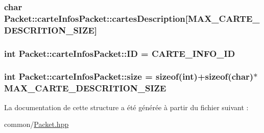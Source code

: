 \subsubsection[{cartes\+Description}]{\setlength{\rightskip}{0pt plus 5cm}char Packet\+::carte\+Infos\+Packet\+::cartes\+Description\mbox{[}{\bf M\+A\+X\+\_\+\+C\+A\+R\+T\+E\+\_\+\+D\+E\+S\+C\+R\+I\+T\+I\+O\+N\+\_\+\+S\+I\+Z\+E}\mbox{]}}\label{structPacket_1_1carteInfosPacket_a3b02e4ea49980ee77d5882fcf5f258ba}
\hypertarget{structPacket_1_1carteInfosPacket_aa385cf584f070650fa90455a9e4d9f90}{}
\subsubsection[{I\+D}]{\setlength{\rightskip}{0pt plus 5cm}int Packet\+::carte\+Infos\+Packet\+::\+I\+D = {\bf C\+A\+R\+T\+E\+\_\+\+I\+N\+F\+O\+\_\+\+I\+D}}\label{structPacket_1_1carteInfosPacket_aa385cf584f070650fa90455a9e4d9f90}
\hypertarget{structPacket_1_1carteInfosPacket_a5b1c8a614c8dcfa1d01d59210bab4d85}{}
\subsubsection[{size}]{\setlength{\rightskip}{0pt plus 5cm}int Packet\+::carte\+Infos\+Packet\+::size = sizeof(int)+sizeof(char)$\ast${\bf M\+A\+X\+\_\+\+C\+A\+R\+T\+E\+\_\+\+D\+E\+S\+C\+R\+I\+T\+I\+O\+N\+\_\+\+S\+I\+Z\+E}}\label{structPacket_1_1carteInfosPacket_a5b1c8a614c8dcfa1d01d59210bab4d85}


La documentation de cette structure a été générée à partir du fichier suivant \+:\begin{DoxyCompactItemize}
\item 
common/\hyperlink{Packet_8hpp}{Packet.\+hpp}\end{DoxyCompactItemize}
